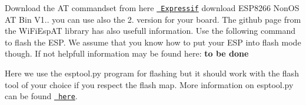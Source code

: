 Download the AT commandset from here \href{https://www.espressif.com/en/support/download/at}{\texttt{ Expressif}} download {\ttfamily E\+S\+P8266 Non\+OS AT Bin V1..} you can use also the 2. version for your board. The github page from the Wi\+Fi\+Esp\+AT library has also usefull information. Use the following command to flash the E\+SP. We assume that you know how to put your E\+SP into flash mode though. If not helpfull information may be found here\+: {\bfseries{to be done}}


\begin{DoxyCode}{0}
\end{DoxyCode}


Here we use the esptool.\+py program for flashing but it should work with the flash tool of your choice if you respect the flash map. More information on esptool.\+py can be found \href{https://github.com/espressif/esptool}{\texttt{ here}}. 
